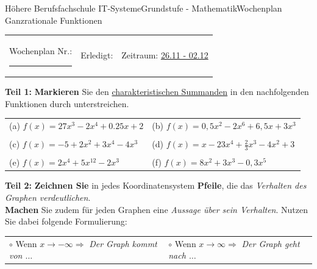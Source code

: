 \documentclass[oneside,openany,headings=optiontotoc,11pt,numbers=noenddot]{scrreprt}
\begin{document}
	\begin{worksheet}{Höhere Berufsfachschule IT-Systeme}{Grundstufe - Mathematik}{Wochenplan Ganzrationale Funktionen}
		\noindent
		\begin{tabularx}{\textwidth}{XXl}
			Wochenplan Nr.: \rule{0.15\textwidth}{1pt} & Erledigt: & Zeitraum: \underline{26.11 - 02.12}
		\end{tabularx}
	
		\begin{framed}
			\noindent
			\textbf{Teil 1:} \textbf{Markieren} Sie den \underline{charakteristischen Summanden} in den nachfolgenden Funktionen durch unterstreichen.\\
			\par\noindent
			\begin{tabularx}{\textwidth}{XX}
				(a) \(f(x) = 27x^3 - 2x^4 + 0.25x + 2\) & (b) \(f(x) = 0,5x^2 - 2x^6 +6,5x + 3x^3\)\\
				\\
				(c) \(f(x) = -5 + 2x^2 + 3x^4 - 4x^3\) & (d) \(f(x) = x - 23x^4 + \frac{2}{3}x^3 - 4x^2 + 3\)\\
				\\
				(e) \(f(x) = 2x^4+5x^{12}-2x^3\) & (f) \(f(x) = 8x^2 + 3x^3 - 0,3x^5\)\\
			\end{tabularx}
		\end{framed}
		\begin{framed}
			\noindent
			\textbf{Teil 2:} \textbf{Zeichnen Sie} in jedes Koordinatensystem \textbf{Pfeile}, die das \textit{Verhalten des Graphen verdeutlichen}.\\
			\textbf{Machen} Sie zudem für jeden Graphen eine \textit{Aussage über sein Verhalten}. Nutzen Sie dabei folgende Formulierung:\\
			\begin{tabularx}{\textwidth}{XX}
				\small
				\(\circ\) Wenn \(x\rightarrow-\infty \Rightarrow\) \textit{Der Graph kommt von \(\ldots\)} & \(\circ\) Wenn \(x\rightarrow\infty \Rightarrow\) \textit{Der Graph geht nach \(\ldots\)}
			\end{tabularx}\\
			\par\noindent
			\begin{tabularx}{\textwidth}{XX}

\end{tabularx}
\end{framed}
\end{worksheet}
\end{document}
